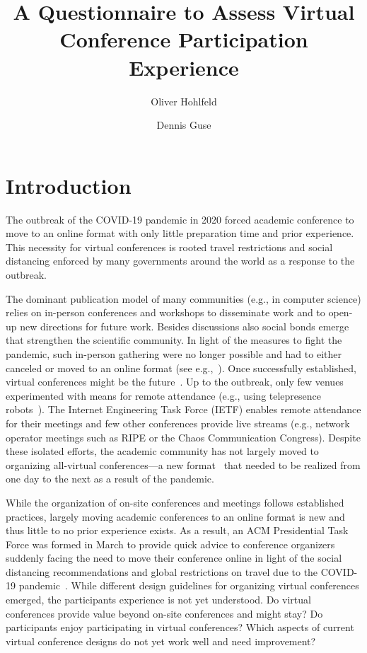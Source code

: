 \documentclass[sigconf]{acmart}
\title{A Questionnaire to Assess Virtual Conference Participation Experience}
\author{Oliver Hohlfeld}
\affiliation{\institution{Brandenburg University of Technology}}
\author{Dennis Guse}
\begin{document}
\maketitle

\sloppypar
\pagestyle{plain}

\section{Introduction}
The outbreak of the COVID-19 pandemic in 2020 forced academic conference to move to an online format with only little preparation time and prior experience.
This necessity for virtual conferences is rooted travel restrictions and social distancing enforced by many governments around the world as a response to the outbreak.

%
%
The dominant publication model of many communities (e.g., in computer science) relies on in-person conferences and workshops to disseminate work and to open-up new directions for future work.
Besides discussions also social bonds emerge that strengthen the scientific community.
In light of the measures to fight the pandemic, such in-person gathering were no longer possible and had to either canceled or moved to an online format (see e.g.,~\cite{bonifati2020holding, ASPLOS,alex2020flexibility}).
Once successfully established, virtual conferences might be the future~\cite{virtConferencesFuture}.
%
%
%
%
%
%
%
%
Up to the outbreak, only few venues experimented with means for remote attendance (e.g., using telepresence robots~\cite{RobotAttendance, RobotAttendance2018}).
The Internet Engineering Task Force (IETF) enables remote attendance for their meetings and few other conferences provide live streams (e.g., network operator meetings such as RIPE or the Chaos Communication Congress).
Despite these isolated efforts, the academic community has not largely moved to organizing all-virtual conferences---a new format~\cite{Price457} that needed to be realized from one day to the next as a result of the pandemic.

While the organization of on-site conferences and meetings follows established practices, largely moving academic conferences to an online format is new and thus little to no prior experience exists.
As a result, an ACM Presidential Task Force was formed in March to provide quick advice to conference organizers suddenly facing the need to move their conference online in light of the social distancing recommendations and global restrictions on travel due to the COVID-19 pandemic~\cite{virtConfTaskforce}.
While different design guidelines for organizing virtual conferences emerged, the participants experience is not yet understood. 
Do virtual conferences provide value beyond on-site conferences and might stay?
Do participants enjoy participating in virtual conferences?
Which aspects of current virtual conference designs do not yet work well and need improvement?
\end{document}
